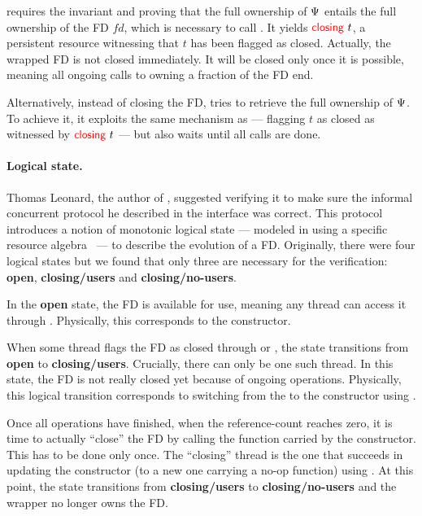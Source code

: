  requires the invariant and proving that the full ownership of $\Psi$ entails the full ownership of the FD $\mathit{fd}$, which is necessary to call .
It yields $\textcolor{red}{\textsf{\upshape closing}}\ t$, a persistent resource witnessing that $t$ has been flagged as closed.
Actually, the wrapped FD is not closed immediately.
It will be closed only once it is possible, meaning all ongoing calls to  owning a fraction of the FD end.

Alternatively, instead of closing the FD,  tries to retrieve the full ownership of $\Psi$.
To achieve it, it exploits the same mechanism as  --- flagging $t$ as closed as witnessed by $\textcolor{red}{\textsf{\upshape closing}}\ t$ --- but also waits until all  calls are done.

\paragraph{Logical state.}
Thomas Leonard, the author of , suggested verifying it to make sure the informal concurrent protocol he described in the \OCaml interface was correct.
This protocol introduces a notion of monotonic logical state --- modeled in \Iris using a specific resource algebra~\citep{DBLP:conf/cpp/TimanyB21} --- to describe the evolution of a FD.
Originally, there were four logical states but we found that only three are necessary for the verification: \textbf{open}, \textbf{closing/users} and \textbf{closing/no-users}.

In the \textbf{open} state, the FD is available for use, meaning any thread can access it through .
Physically, this corresponds to the  constructor.

When some thread flags the FD as closed through  or , the state transitions from \textbf{open} to \textbf{closing/users}.
Crucially, there can only be one such thread.
In this state, the FD is not really closed yet because of ongoing  operations.
Physically, this logical transition corresponds to switching from the  to the  constructor using .

Once all  operations have finished, when the reference-count reaches zero, it is time to actually ``close'' the FD by calling the function carried by the  constructor.
This has to be done only once.
The ``closing'' thread is the one that succeeds in updating the  constructor (to a new one carrying a no-op function) using .
At this point, the state transitions from \textbf{closing/users} to \textbf{closing/no-users} and the wrapper no longer owns the FD.


